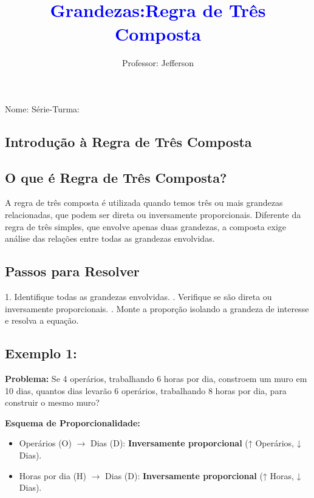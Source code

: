 \documentclass[12pt]{article}
\title{\textcolor{blue}{Grandezas:Regra de Três Composta}}
\author{Professor: Jefferson}
\date{}
\begin{document}
\maketitle

\begin{center}
\large{Nome: \underline{\hspace{8cm}} \quad Série-Turma: \underline{\hspace{3cm}}}
\end{center}


\begin{multicols}{2}

\section*{Introdução à Regra de Três Composta}

\subsection*{O que é Regra de Três Composta?}
A regra de três composta é utilizada quando temos três ou mais grandezas relacionadas, que podem ser direta ou inversamente proporcionais. Diferente da regra de três simples, que envolve apenas duas grandezas, a composta exige análise das relações entre todas as grandezas envolvidas.

\subsection*{Passos para Resolver}
1. Identifique todas as grandezas envolvidas. . Verifique se são direta ou inversamente proporcionais. . Monte a proporção isolando a grandeza de interesse  e resolva a equação.

\subsection*{Exemplo 1:}
\textbf{Problema:} Se 4 operários, trabalhando 6 horas por dia, constroem um muro em 10 dias, quantos dias levarão 6 operários, trabalhando 8 horas por dia, para construir o mesmo muro?

\textbf{Esquema de Proporcionalidade:}
\begin{itemize}
    \item Operários (O) $\rightarrow$ Dias (D): \textbf{Inversamente proporcional} (↑ Operários, ↓ Dias).
    \item Horas por dia (H) $\rightarrow$ Dias (D): \textbf{Inversamente proporcional} (↑ Horas, ↓ Dias).
\end{itemize}


\end{multicols}
\end{document}
